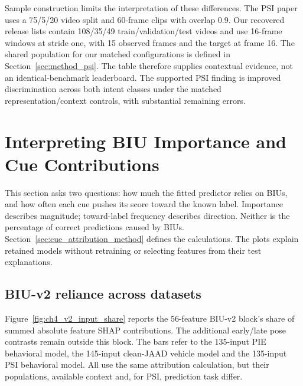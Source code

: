 Sample construction limits the interpretation of these differences. The PSI paper
uses a 75/5/20 video split and 60-frame clips with overlap 0.9. Our recovered release lists
contain 108/35/49 train/validation/test videos and use 16-frame windows at stride one,
with 15 observed frames and the target at frame 16. The shared population for our matched configurations is defined in
Section~\ref{sec:method_psi}. The table therefore supplies contextual
evidence, not an identical-benchmark
leaderboard.
The supported PSI finding is improved discrimination across both intent classes under
the matched representation/context controls, with substantial remaining errors.


\FloatBarrier
\section{Interpreting BIU Importance and Cue Contributions}\label{sec:ch4_inspectability}

This section asks two questions: how much the fitted predictor relies on BIUs, and
how often each cue pushes its score toward the known label. Importance describes
magnitude; toward-label frequency describes direction. Neither is the percentage of
correct predictions caused by BIUs. Section~\ref{sec:cue_attribution_method} defines
the calculations. The plots explain retained models without retraining or selecting
features from their test explanations.

\subsection{BIU-v2 reliance across datasets}

Figure~\ref{fig:ch4_v2_input_share} reports the 56-feature BIU-v2 block's share of
summed absolute feature SHAP contributions. The additional early/late pose contrasts remain
outside this block. The bars refer to the 135-input PIE behavioral model, the
145-input clean-JAAD vehicle model and the 135-input PSI behavioral model.
All use the same attribution calculation, but their populations, available context
and, for PSI, prediction task differ.

